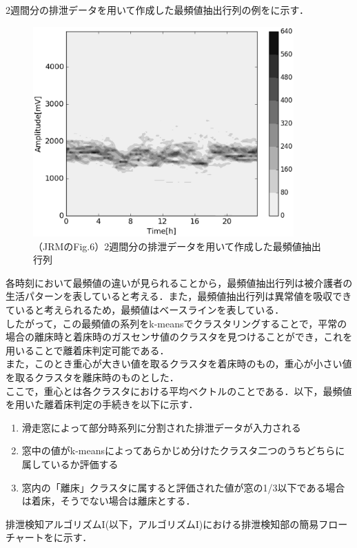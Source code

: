 2週間分の排泄データを用いて作成した最頻値抽出行列の例をに示す．

\begin{figure}[t]
\centering
\includegraphics[width=10cm]{./fig/C_matrix.eps}
\caption{（JRMのFig.6）2週間分の排泄データを用いて作成した最頻値抽出行列}
\label{hist-spectrogram}
\end{figure}

各時刻において最頻値の違いが見られることから，最頻値抽出行列は被介護者の生活パターンを表していると考える．また，最頻値抽出行列は異常値を吸収できていると考えられるため，最頻値はベースラインを表している．\\
したがって，この最頻値の系列をk-meansでクラスタリングすることで，平常の場合の離床時と着床時のガスセンサ値のクラスタを見つけることができ，これを用いることで離着床判定可能である．\\
また，このとき重心が大きい値を取るクラスタを着床時のもの，重心が小さい値を取るクラスタを離床時のものとした．\\
ここで，重心とは各クラスタにおける平均ベクトルのことである．以下，最頻値を用いた離着床判定の手続きを以下に示す．

\begin{enumerate}
\item 滑走窓によって部分時系列に分割された排泄データが入力される
\item 窓中の値がk-meansによってあらかじめ分けたクラスタ二つのうちどちらに属しているか評価する
\item 窓内の「離床」クラスタに属すると評価された値が窓の1/3以下である場合は着床，そうでない場合は離床とする．
\end{enumerate}

排泄検知アルゴリズムI(以下，アルゴリズムI)における排泄検知部の簡易フローチャートをに示す．

